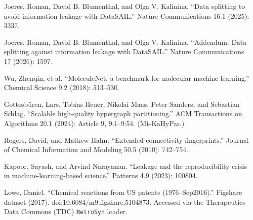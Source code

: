 \documentclass{article}
\begin{document}
\newpage

\begin{thebibliography}{}

Joeres, Roman, David B. Blumenthal, and Olga V. Kalinina. ``Data splitting to avoid information leakage with DataSAIL.'' Nature Communications 16.1 (2025): 3337.

Joeres, Roman, David B. Blumenthal, and Olga V. Kalinina. ``Addendum: Data splitting against information leakage with DataSAIL.'' Nature Communications 17 (2026): 1597.

Wu, Zhenqin, et al. ``MoleculeNet: a benchmark for molecular machine learning.'' Chemical Science 9.2 (2018): 513--530.

Gottesb\"uren, Lars, Tobias Heuer, Nikolai Maas, Peter Sanders, and Sebastian Schlag. ``Scalable high-quality hypergraph partitioning.'' ACM Transactions on Algorithms 20.1 (2024): Article 9, 9:1--9:54. (Mt-KaHyPar.)

Rogers, David, and Mathew Hahn. ``Extended-connectivity fingerprints.'' Journal of Chemical Information and Modeling 50.5 (2010): 742--754.

Kapoor, Sayash, and Arvind Narayanan. ``Leakage and the reproducibility crisis in machine-learning-based science.'' Patterns 4.9 (2023): 100804.

Lowe, Daniel. ``Chemical reactions from US patents (1976--Sep2016).'' Figshare dataset (2017). doi:10.6084/m9.figshare.5104873. Accessed via the Therapeutics Data Commons (TDC) \texttt{RetroSyn} loader.

\end{thebibliography}



\end{document}
